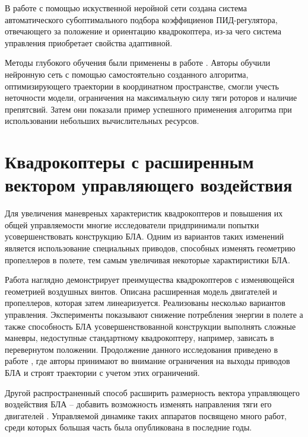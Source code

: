 В работе \cite{Evgenov01} с помощью искуственной неройной сети создана система автоматического субоптимального подбора коэффициенов ПИД-регулятора, отвечающего за положение и ориентацию квадрокоптера, из-за чего система управления приобретает свойства адаптивной.

Методы глубокого обучения были применены в работе \cite{Andersson01}. Авторы обучили нейронную сеть с помощью самостоятельно созданного алгоритма, оптимизирующего траектории в координатном пространстве, смогли учесть неточности модели, ограничения на максимальную силу тяги роторов и наличие препятсвий.
Затем они показали пример успешного применения алгоритма при использовании небольших вычислительных ресурсов.

\section{Квадрокоптеры с расширенным вектором управляющего воздействия}

Для увеличения маневреных характеристик квадрокоптеров и повышения их общей управляемости многие исследователи придпринимали попытки усовершенствовать конструкцию БЛА. Одним из вариантов таких изменений является использование специальных приводов, способных изменять геометрию пропеллеров в полете, тем самым увеличивая некоторые характиристики БЛА.

Работа \cite{Cutler01} наглядно демонстрирует преимущества квадрокоптеров с изменяющейся геометрией воздушных винтов. Описана расширенная модель двигателей и пропеллеров, которая затем линеаризуется. Реализованы несколько вариантов управления. Эксперименты показывают снижение потребления энергии в полете а также способность БЛА усовершенствованной конструкции выполнять сложные маневры, недоступные стандартному квадрокоптеру, например, зависать в перевернутом положении. Продолжение данного исследования приведено в работе \cite{Cutler02}, где авторы принимают во внимание ограничения на выходы приводов БЛА и строят траектории с учетом этих ограничений.

Другой распространенный способ расширить размерность вектора управляющего воздействия БЛА -- добавить возможность изменять направления тяги его двигателей \cite{Papachristos01, Gupta01, Lin01, Dharmawan01}. Управляемой динамике таких аппаратов посвящено много работ, среди которых большая часть была опубликована в последние годы.

